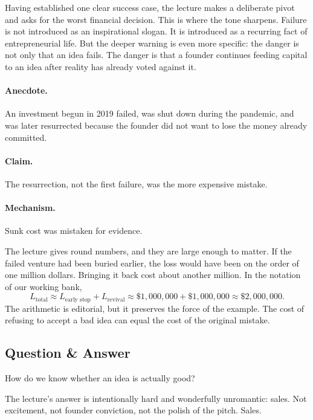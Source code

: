 Having established one clear success case, the lecture makes a deliberate pivot and asks for the worst financial decision. This is where the tone sharpens. Failure is not introduced as an inspirational slogan. It is introduced as a recurring fact of entrepreneurial life. But the deeper warning is even more specific: the danger is not only that an idea fails. The danger is that a founder continues feeding capital to an idea after reality has already voted against it.

\paragraph{Anecdote.}
An investment begun in 2019 failed, was shut down during the pandemic, and was later resurrected because the founder did not want to lose the money already committed.

\paragraph{Claim.}
The resurrection, not the first failure, was the more expensive mistake.

\paragraph{Mechanism.}
Sunk cost was mistaken for evidence.

The lecture gives round numbers, and they are large enough to matter. If the failed venture had been buried earlier, the loss would have been on the order of one million dollars. Bringing it back cost about another million. In the notation of our working bank,
\begin{equation}
L_{\text{total}}
\approx
L_{\text{early stop}} + L_{\text{revival}}
\approx
\text{\$}1{,}000{,}000 + \text{\$}1{,}000{,}000
\approx
\text{\$}2{,}000{,}000.
\end{equation}
The arithmetic is editorial, but it preserves the force of the example. The cost of refusing to accept a bad idea can equal the cost of the original mistake.

\subsection{Question \& Answer}

How do we know whether an idea is actually good?

The lecture's answer is intentionally hard and wonderfully unromantic: sales. Not excitement, not founder conviction, not the polish of the pitch. Sales.

